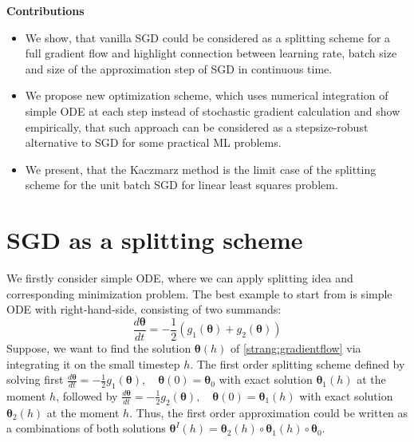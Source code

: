 \documentclass{article}
\newcommand{\vect}[1]{\boldsymbol{\mathbf{#1}}}
\begin{document}
\textbf{Contributions}
\begin{itemize}
    \item We show, that vanilla SGD could be considered as a splitting scheme for a full gradient flow and highlight connection between learning rate, batch size and size of the approximation step of SGD in continuous time.
    \item  We propose new optimization scheme, which uses numerical integration of simple ODE at each step instead of stochastic gradient calculation and show empirically, that such approach can be considered as a stepsize-robust alternative to SGD for some practical ML problems.
    \item We present, that the Kaczmarz method is the limit case of the splitting scheme for the unit batch SGD for linear least squares problem.
\end{itemize}


\section{SGD as a splitting scheme}

We firstly consider simple ODE, where we can apply splitting idea and corresponding minimization problem. The best example to start from is simple ODE with right-hand-side, consisting of two summands:
\begin{equation}
    \frac{d \vect{\theta}}{d t} = - \frac{1}{2} \left( g_1(\vect{\theta}) + g_2(\vect{\theta})\right)
    \label{strang:gradientflow}
\end{equation}
Suppose, we want to find the solution $\vect{\theta}(h)$ of \eqref{strang:gradientflow} via integrating it on the small timestep $h$. The first order splitting scheme defined by solving first $\frac{d \vect{\theta}}{d t} = - \frac{1}{2} g_1(\vect{\theta}), \quad \vect{\theta}(0) = \vect{\theta}_0$ with exact solution $\vect{\theta}_1(h)$ at the moment $h$, followed by $\frac{d \vect{\theta}}{d t} = - \frac{1}{2} g_2(\vect{\theta}), \quad \vect{\theta}(0) = \vect{\theta}_1(h)$ with exact solution $\vect{\theta}_2(h)$ at the moment $h$. Thus, the first order approximation could be written as a combinations of both solutions $\vect{\theta}^I(h) = \vect{\theta}_2(h) \circ \vect{\theta}_1(h) \circ \vect{\theta}_0$.
\end{document}
